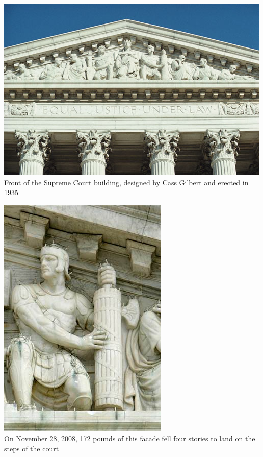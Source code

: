 \begin{frame}
    \centering
    \includegraphics[width=.9\textwidth]{img/supremecourtfasces.jpg} \\
    \large{ Front of the Supreme Court building, designed by Cass Gilbert and erected in 1935 } \\
\end{frame}

\begin{frame}
    \centering
    \includegraphics[height=.85\textheight]{img/fasces_west_supcourt.jpg} \\
    \large{ On November 28, 2008, 172 pounds of this facade fell four stories to land on the steps of the court } \\
\end{frame}

